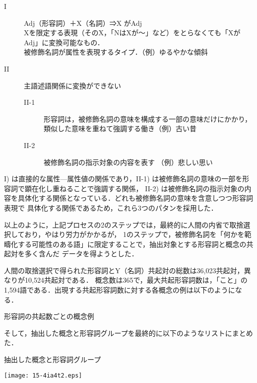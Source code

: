 \documentclass[japanese]{jnlp_1.4}
\begin{document}
\begin{description}
\item[I]
Adj（形容詞）＋X（名詞）⇒X がAdj\\
Xを限定する表現（そのX，「NはXが〜」など）をとらなくても「XがAdj」に変換可能なもの．\\
被修飾名詞が属性を表現するタイプ．（例）ゆるやかな傾斜
\item[II]
主語述語関係に変換ができない
\begin{description}
\item[II-1]
形容詞は，被修飾名詞の意味を構成する一部の意味だけにかかり，類似した意味を重ねて強調する働き（例）古い昔
\item[II-2]
被修飾名詞の指示対象の内容を表す （例）悲しい思い
\end{description}
\end{description}

I) は直接的な属性—属性値の関係であり，II-1) は被修飾名詞の意味の一部を形容詞で顕在化し重ねることで強調する関係，
II-2) は被修飾名詞の指示対象の内容を具体化する関係となっている．どれも被修飾名詞の意味を含意しつつ形容詞表現で
具体化する関係であるため，これら3つのパタンを採用した．

以上のように，上記プロセスの2のステップでは，最終的に人間の内省で取捨選択しており，やはり労力がかかるが，
1のステップで，被修飾名詞を「何かを範疇化する可能性のある語」に限定することで，抽出対象とする形容詞と概念の共起対を多く含んだ
データを得ようとした．

人間の取捨選択で得られた形容詞とY（名詞）共起対の総数は36,023共起対，異なりが10,524共起対である．
概念数は365で，最大共起形容詞数は，「こと」の1,594語である．出現する共起形容詞数に対する各概念の例は以下のようになる．

\pagebreak

\begin{table}[h]
\caption{形容詞の共起数ごとの概念例}
\begin{center}

\end{center}
\end{table}

そして，抽出した概念と形容詞グループを最終的に以下のようなリストにまとめた．

\begin{table}[h]
\caption{抽出した概念と形容詞グループ}
\begin{center}
\texttt{[image: 15-4ia4t2.eps]}
\end{center} 
\end{table}
\end{document}
